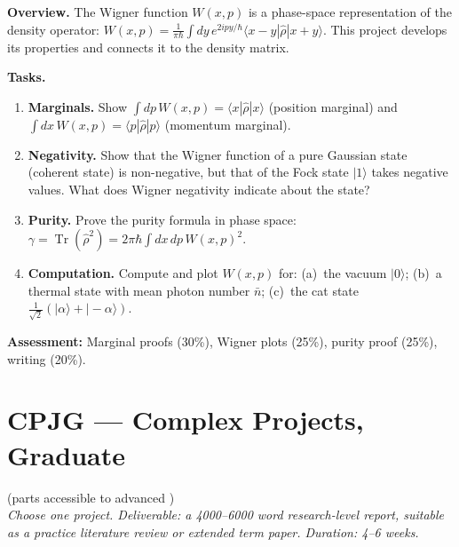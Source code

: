 \documentclass[11pt,a4paper]{article}
\begin{document}
\begin{tcolorbox}[gradprobbox, title={Project SG3 --- The Wigner Function and Phase-Space Density Matrices}]

\textbf{Overview.}
The Wigner function $W(x,p)$ is a phase-space representation of the density
operator: $W(x,p)=\tfrac{1}{\pi\hbar}\int dy\,e^{2ipy/\hbar}\langle x-y|\hat{\rho}|x+y\rangle$.
This project develops its properties and connects it to the density matrix.

\medskip\textbf{Tasks.}
\begin{enumerate}[leftmargin=1.8em, label=\textbf{\arabic*.}, itemsep=6pt]
  \item \textbf{Marginals.}
        Show $\int dp\,W(x,p)=\langle x|\hat{\rho}|x\rangle$ (position marginal)
        and $\int dx\,W(x,p)=\langle p|\hat{\rho}|p\rangle$ (momentum marginal).
  \item \textbf{Negativity.}
        Show that the Wigner function of a pure Gaussian state (coherent state) is non-negative,
        but that of the Fock state $|1\rangle$ takes negative values.
        What does Wigner negativity indicate about the state?
  \item \textbf{Purity.}
        Prove the purity formula in phase space:
        $\gamma=\operatorname{Tr}(\hat{\rho}^2)=2\pi\hbar\int dx\,dp\,W(x,p)^2$.
  \item \textbf{Computation.}
        Compute and plot $W(x,p)$ for:
        (a)~the vacuum $|0\rangle$; (b)~a thermal state with mean photon number $\bar{n}$;
        (c)~the cat state $\tfrac{1}{\sqrt{2}}(|\alpha\rangle+|-\alpha\rangle)$.
\end{enumerate}

\medskip\textbf{Assessment:} Marginal proofs (30\%), Wigner plots (25\%), purity proof (25\%), writing (20\%).
\end{tcolorbox}

\newpage
\section*{CPJG --- Complex Projects, Graduate}
\begin{center}
   (parts accessible to advanced )\\[6pt]
  \textit{Choose one project. Deliverable: a 4000--6000 word research-level report,
  suitable as a practice literature review or extended term paper.
  Duration: 4--6 weeks.}
\end{center}
\end{document}
